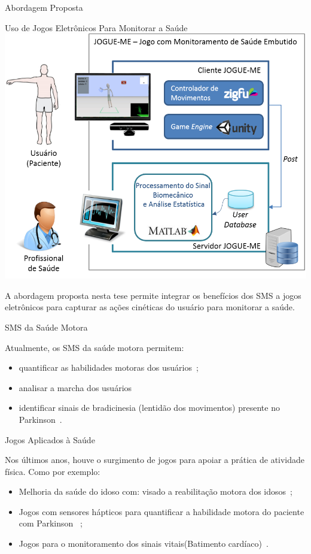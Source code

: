 \documentclass{beamer}
\begin{document}
\begin{frame}{Abordagem Proposta}
  \begin{block}{Uso de Jogos Eletrônicos Para Monitorar a Saúde}
      \center \includegraphics[height=1.8 in]{img/visaosistema.png}
  \end{block}
  \begin{block}{ }
A abordagem proposta nesta tese permite integrar os benefícios dos SMS a jogos eletrônicos para capturar as ações cinéticas do usuário para monitorar a saúde. 
  \end{block}
\end{frame}



\begin{frame}{SMS da Saúde Motora}  
  \begin{block}{}  
  Atualmente, os SMS da saúde motora permitem:  
    \begin{itemize}[<+->]
    \item quantificar as habilidades motoras dos usuários~\cite{manumeterjbhi2014,patel_monitoring_2009};
    \item analisar a marcha dos usuários~\cite{robotgait2014}
    \item identificar sinais de bradicinesia (lentidão dos movimentos) presente no Parkinson~\cite{ambulatoryparkinson2010}. 
    \end{itemize}   
  \end{block}   
\end{frame}




\begin{frame}{Jogos Aplicados à Saúde}
	\begin{block}{}	
	Nos últimos anos, houve o surgimento de jogos para apoiar a prática de atividade física. Como por exemplo:
	
	\begin{itemize}[<+->]
	    \item Melhoria da saúde do idoso com: visado a reabilitação motora dos idosos~\cite{sacbespoke2014};
	    \item Jogos com sensores hápticos para quantificar a habilidade motora do paciente com Parkinson ~\cite{atkinson2010};
	    \item Jogos para o monitoramento dos sinais vitais(Batimento cardíaco)~\cite{Sinclair:2009:UVB:1515604.1515617}.
	\end{itemize}
	\end{block}
\end{frame}
\end{document}
